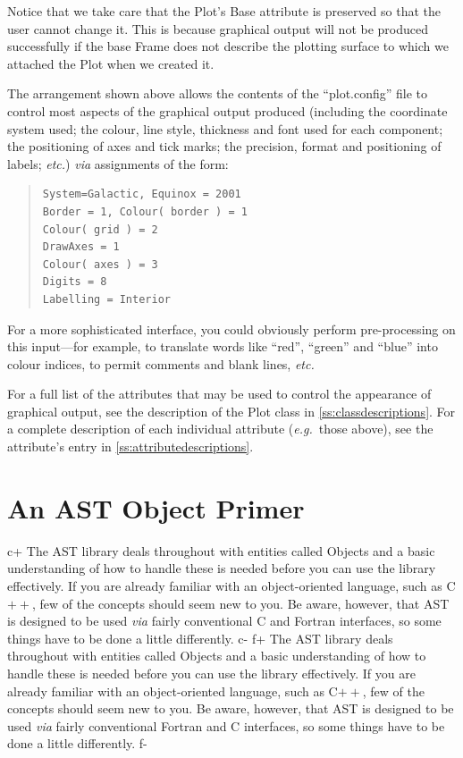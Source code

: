 \documentclass[twoside,11pt]{article}
\newcommand{\appref}[1]{Appendix~\ref{#1}}
\renewcommand{\appref}[1]{\ref{#1}}
\begin{document}
Notice that we take care that the Plot's Base attribute is preserved
so that the user cannot change it. This is because graphical output
will not be produced successfully if the base Frame does not describe
the plotting surface to which we attached the Plot when we created it.

The arrangement shown above allows the contents of the ``plot.config''
file to control most aspects of the graphical output produced
(including the coordinate system used; the colour, line style,
thickness and font used for each component; the positioning of axes
and tick marks; the precision, format and positioning of labels;
{\em{etc.}}) {\em{via}} assignments of the form:

\begin{quote}
\small
\begin{verbatim}
System=Galactic, Equinox = 2001
Border = 1, Colour( border ) = 1
Colour( grid ) = 2
DrawAxes = 1
Colour( axes ) = 3
Digits = 8
Labelling = Interior
\end{verbatim}
\normalsize
\end{quote}

For a more sophisticated interface, you could obviously perform
pre-processing on this input---for example, to translate words like
``red'', ``green'' and ``blue'' into colour indices, to permit
comments and blank lines, {\em{etc.}}

For a full list of the attributes that may be used to control the
appearance of graphical output, see the description of the Plot class
in \appref{ss:classdescriptions}. For a complete description of each
individual attribute ({\em{e.g.}}\ those above), see the attribute's
entry in \appref{ss:attributedescriptions}.

\cleardoublepage
\section{\label{ss:primer}An AST Object Primer}

c+
The AST library deals throughout with entities called Objects and a
basic understanding of how to handle these is needed before you can
use the library effectively.  If you are already familiar with an
object-oriented language, such as C$++$, few of the concepts should
seem new to you.  Be aware, however, that AST is designed to be used
{\em{via}} fairly conventional C and Fortran interfaces, so some
things have to be done a little differently.
c-
f+
The AST library deals throughout with entities called Objects and a
basic understanding of how to handle these is needed before you can
use the library effectively.  If you are already familiar with an
object-oriented language, such as C$++$, few of the concepts should
seem new to you.  Be aware, however, that AST is designed to be used
{\em{via}} fairly conventional Fortran and C interfaces, so some
things have to be done a little differently.
f-
\end{document}
